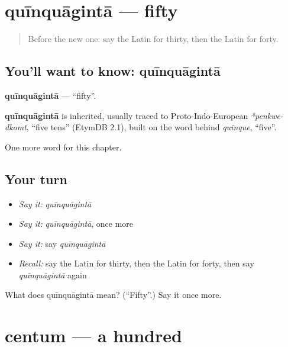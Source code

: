 \section[quīnquāgintā]{quīnquāgintā — fifty}

\label{lesson:LA-C106-quinquaginta}



\begin{quote}
Before the new one: say the Latin for thirty, then the Latin for forty.
\end{quote}

\subsection*{You'll want to know: quīnquāgintā}
\textbf{quīnquāgintā} — \textquotedblleft{}fifty\textquotedblright{}.

\begin{cousinweb}
\textbf{quīnquāgintā} is inherited, usually traced to Proto-Indo-European \emph{*penkwe-dkomt}, \textquotedblleft{}five tens\textquotedblright{} (EtymDB 2.1), built on the word behind \emph{quīnque}, \textquotedblleft{}five\textquotedblright{}.
\end{cousinweb}

\begin{grammarlens}[title={What you've built}]
One more word for this chapter.
\end{grammarlens}

\subsection*{Your turn}
\begin{itemize}
\raggedright
  \item \emph{Say it:} \emph{quīnquāgintā}
  \item \emph{Say it:} \emph{quīnquāgintā}, once more
  \item \emph{Say it:} say \emph{quīnquāgintā}
  \item \emph{Recall:} say the Latin for thirty, then the Latin for forty, then say \emph{quīnquāgintā} again
\end{itemize}

\begin{tcolorbox}[breakable,colback=teal!4,colframe=teal!35!black,title={Before you move on}]
What does quīnquāgintā mean? (\textquotedblleft{}Fifty\textquotedblright{}.) Say it once more.
\end{tcolorbox}
\section[centum]{centum — a hundred}

